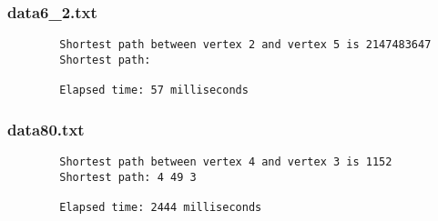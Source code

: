 \documentclass{article}
\begin{document}
    \subsubsection*{data6_2.txt}
    \begin{verbatim}
        Shortest path between vertex 2 and vertex 5 is 2147483647
        Shortest path:

        Elapsed time: 57 milliseconds
    \end{verbatim}

    \subsubsection*{data80.txt}
    \begin{verbatim}
        Shortest path between vertex 4 and vertex 3 is 1152
        Shortest path: 4 49 3

        Elapsed time: 2444 milliseconds
    \end{verbatim}
\end{document}
